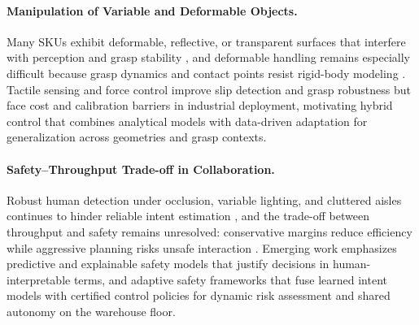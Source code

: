 \paragraph{Manipulation of Variable and Deformable Objects.}
Many SKUs exhibit deformable, reflective, or transparent surfaces that interfere with perception and grasp stability \cite{Calli2015YCB,Mahler2017DexNet}, and deformable handling remains especially difficult because grasp dynamics and contact points resist rigid-body modeling \cite{Levine2016DeepGrasp}. 
Tactile sensing and force control improve slip detection and grasp robustness but face cost and calibration barriers in industrial deployment, motivating hybrid control that combines analytical models with data-driven adaptation for generalization across geometries and grasp contexts.

\paragraph{Safety--Throughput Trade-off in Collaboration.}
Robust human detection under occlusion, variable lighting, and cluttered aisles continues to hinder reliable intent estimation \cite{dragan2013legibility,Mainprice2016Intent}, and the trade-off between throughput and safety remains unresolved: conservative margins reduce efficiency while aggressive planning risks unsafe interaction \cite{Lasota2015HRC}. 
Emerging work emphasizes predictive and explainable safety models that justify decisions in human-interpretable terms, and adaptive safety frameworks that fuse learned intent models with certified control policies for dynamic risk assessment and shared autonomy on the warehouse floor.
